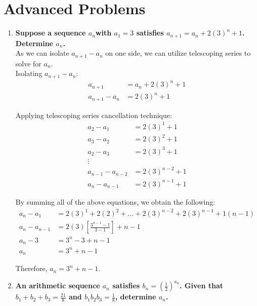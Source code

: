 \documentclass[12pt]{article}
\begin{document}
\section*{Advanced Problems}
\begin{enumerate}
    \item \textbf{Suppose a sequence ${a_n}$with $a_1 = 3$ satisfies $a_{n + 1} = a_n + 2(3)^n + 1$. Determine $a_n$.} \\
    
    As we can isolate $a_{n + 1} - a_{n}$ on one side, we can utilize telescoping series to solve for $a_n$. \\
    
    Isolating $a_{n + 1} - a_n$:
    \begin{align*}
        a_{n+1} & = a_n + 2(3)^n + 1 \\
        a_{n + 1} - a_n & = 2(3)^n + 1
    \end{align*}
    
    Applying telescoping series cancellation technique:
    \begin{align*}
        a_{2} - a_1 & = 2(3)^1 + 1 \\
        a_{3} - a_2 & = 2(3)^2 + 1 \\
        a_{2} - a_3 & = 2(3)^3 + 1 \\
        \vdots & \\
        a_{n-1} - a_{n - 2} & = 2(3)^{n - 2} + 1 \\
        a_{n} - a_{n - 1} & = 2(3)^{n - 1} + 1
    \end{align*}
    
    By summing all of the above equations, we obtain the following:
    \begin{align*}
        a_{n} - a_{1} & = 2(3)^1 + 2(2)^2 + \dots + 2(3)^{n - 2} + 2(3)^{n - 1} + 1(n - 1) \\
        a_{n} - a_{n - 1} & = 2(3)[\frac{3^{n - 1} - 1}{3 - 1}] + n - 1 \\
        a_{n} - 3 & = 3^n - 3 + n - 1 \\
        a_{n} & = 3^n + n - 1
    \end{align*}

    Therefore, $a_n = 3^n + n - 1$.
    
    \newpage

    \item \textbf{An arithmetic sequence ${a_n}$ satisfies $b_n = (\frac{1}{2})^{a_n}$. Given that $b_1 + b_2 + b_3 = \frac{21}{8}$ and $b_1b_2b_3 = \frac{1}{8}$, determine $a_n$.}
\end{enumerate}
\end{document}
